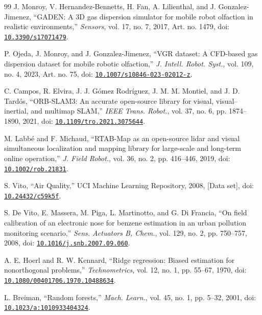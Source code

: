 \begin{thebibliography}{99}
J. Monroy, V. Hernandez-Bennetts, H. Fan, A. Lilienthal, and J. Gonzalez-Jimenez, “GADEN: A 3D gas dispersion simulator for mobile robot olfaction in realistic environments,” \textit{Sensors}, vol. 17, no. 7, 2017, Art. no. 1479, doi: \href{https://doi.org/10.3390/s17071479}{\nolinkurl{10.3390/s17071479}}.

P. Ojeda, J. Monroy, and J. Gonzalez-Jimenez, “VGR dataset: A CFD-based gas dispersion dataset for mobile robotic olfaction,” \textit{J. Intell. Robot. Syst.}, vol. 109, no. 4, 2023, Art. no. 75, doi: \href{https://doi.org/10.1007/s10846-023-02012-z}{\nolinkurl{10.1007/s10846-023-02012-z}}.

C. Campos, R. Elvira, J. J. Gómez Rodríguez, J. M. M. Montiel, and J. D. Tardós, “ORB-SLAM3: An accurate open-source library for visual, visual--inertial, and multimap SLAM,” \textit{IEEE Trans. Robot.}, vol. 37, no. 6, pp. 1874--1890, 2021, doi: \href{https://doi.org/10.1109/tro.2021.3075644}{\nolinkurl{10.1109/tro.2021.3075644}}.

M. Labbé and F. Michaud, “RTAB-Map as an open-source lidar and visual simultaneous localization and mapping library for large-scale and long-term online operation,” \textit{J. Field Robot.}, vol. 36, no. 2, pp. 416--446, 2019, doi: \href{https://doi.org/10.1002/rob.21831}{\nolinkurl{10.1002/rob.21831}}.

S. Vito, “Air Quality,” UCI Machine Learning Repository, 2008, [Data set], doi: \href{https://doi.org/10.24432/c59k5f}{\nolinkurl{10.24432/c59k5f}}.

S. De Vito, E. Massera, M. Piga, L. Martinotto, and G. Di Francia, “On field calibration of an electronic nose for benzene estimation in an urban pollution monitoring scenario,” \textit{Sens. Actuators B, Chem.}, vol. 129, no. 2, pp. 750--757, 2008, doi: \href{https://doi.org/10.1016/j.snb.2007.09.060}{\nolinkurl{10.1016/j.snb.2007.09.060}}.

A. E. Hoerl and R. W. Kennard, “Ridge regression: Biased estimation for nonorthogonal problems,” \textit{Technometrics}, vol. 12, no. 1, pp. 55--67, 1970, doi: \href{https://doi.org/10.1080/00401706.1970.10488634}{\nolinkurl{10.1080/00401706.1970.10488634}}.

L. Breiman, “Random forests,” \textit{Mach. Learn.}, vol. 45, no. 1, pp. 5--32, 2001, doi: \href{https://doi.org/10.1023/a:1010933404324}{\nolinkurl{10.1023/a:1010933404324}}.


\end{thebibliography}
